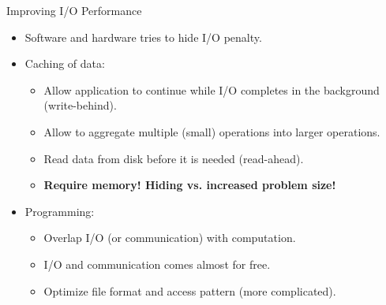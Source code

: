 \documentclass[compress,11pt,xcolor=svgnames,aspectratio=169]{beamer}
\begin{document}
\begin{frame}[fragile]{Improving I/O Performance}

\begin{itemize}
\setlength\itemsep{0.3cm}

\item Software and hardware tries to hide I/O penalty.

\item Caching of data:

  \begin{itemize}
  \setlength\itemsep{0.2cm}
    \item Allow application to continue while I/O completes in the background (write-behind).
    \item Allow to aggregate multiple (small) operations into larger operations.
    \item Read data from disk before it is needed (read-ahead).
    \item \textbf{Require memory! Hiding vs. increased problem size!}
  \end{itemize}

\item Programming:

  \begin{itemize}
  \setlength\itemsep{0.2cm}
    \item Overlap I/O (or communication) with computation.
    \item I/O and communication comes almost for free.
    \item Optimize file format and access pattern (more complicated).
  \end{itemize}

\end{itemize}

\end{frame}
\end{document}

